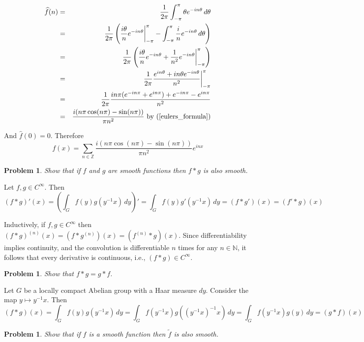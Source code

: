 \documentclass[letterpaper,11pt]{article}
\newtheorem{problem}[theorem]{Problem}
\newcommand{\N}{\mathbb{N}}
\newcommand{\Z}{\mathbb{Z}}
\begin{document}
\begin{eqnarray*}
\widehat{f}(n) &=& \frac{1}{2\pi} \int_{-\pi}^{\pi} \theta e^{-in\theta} \,d\theta \\
&=& \frac{1}{2\pi} \left(\frac{i\theta}{n} e^{-in\theta} \bigg|_{-\pi}^{\pi} - \int_{-\pi}^{\pi} \frac{i}{n} e^{-in\theta} \,d\theta \right)\\
&=& \frac{1}{2\pi} \left( \frac{i\theta}{n} e^{-in\theta} + \frac{1}{n^2} e^{-in\theta} \bigg|_{-\pi}^{\pi} \right) \\
&=& \frac{1}{2\pi} \frac{e^{i n \theta} + in\theta e^{-in\theta}}{n^2} \bigg|_{-\pi}^{\pi} \\
&=& \frac{1}{2\pi} \frac{in\pi(e^{-in\pi} + e^{in\pi}) + e^{-in\pi} - e^{in\pi}}{n^2} \\
&=& \frac{i(n\pi\cos(n\pi) - \sin(n\pi))}{\pi n^2} \mbox{ by ($\ref{eulers_formula}$)}
\end{eqnarray*}

And $\widehat{f}(0) = 0$.  Therefore
\[
f(x) = \sum_{n \in \Z}  \frac{i(n\pi\cos(n\pi) - \sin(n\pi))}{\pi n^2} e^{inx}
\]

\begin{problem}
Show that if $f$ and $g$ are smooth functions then $f \ast g$ is also smooth.
\end{problem}

Let $f,g \in C^\infty$.  Then
\[
(f \ast g)'(x) = \left(\int_G f(y)g(y^{-1}x) \,dy\right)' = \int_G f(y)g'(y^{-1}x) \,dy = (f\ast g')(x) = (f' \ast g)(x)
\]

Inductively, if $f,g \in C^\infty$ then $(f \ast g)^{(n)}(x) = (f \ast g^{(n)})(x) = (f^{(n)} \ast g)(x)$.  Since differentiability implies continuity, and the convolution is differentiable $n$ times for any $n \in \N$, it follows that every derivative is continuous, i.e., $(f \ast g) \in C^\infty$.
\begin{problem}
Show that $f \ast g = g\ast f$.
\end{problem}

Let $G$ be a locally compact Abelian group with a Haar measure $dy$. Consider the map $y \mapsto y^{-1}x$.  Then
\begin{equation*}
(f \ast g)(x) = \int_G f(y)g(y^{-1}x)\,dy = \int_G f(y^{-1}x)g((y^{-1}x)^{-1}x)\,dy = \int_G f(y^{-1}x)g(y)\,dy = (g \ast f)(x)
\end{equation*}

\newpage
\begin{problem}
Show that if $f$ is a smooth function then $\tilde{f}$ is also smooth.
\end{problem}
\end{document}
